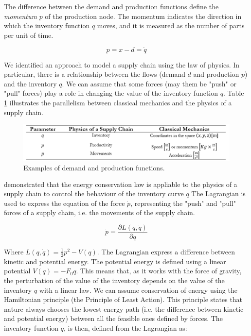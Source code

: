 The difference between the demand and production functions define the \textit{momentum} $p$ of the production node. The momentum indicates the direction in which the inventory function $q$ moves, and it is measured as the number of parts per unit of time.

\begin{equation}
p=x-d=\dot{q}
\label{eq_physics2}
\end{equation}

We identified an approach to model a supply chain using the law of physics. In particular, there is a relationship between the flows (demand $d$ and production $p$) and the inventory $q$. We can assume that some forces (may them be "push" or "pull" forces) play a role in changing the value of the inventory function $q$. Table \ref{tab_classicalMechanics} illustrates the parallelism between classical mechanics and the physics of a supply chain.

\begin{figure}[hbt!]
\centering
\includegraphics[width=1\textwidth]{SectionIntroduction/informationFramework_figures/tab_classicalMechanics.png}
\captionsetup{type=figure}
\caption{Examples of demand and production functions.}
\label{tab_classicalMechanics}
\end{figure}

\cite{Spearman2014} demonstrated that the energy conservation law is appliable to the physics of a supply chain to control the behaviour of the inventory curve $q$ The Lagrangian is used to express the equation of the force $\dot{p}$, representing the "push" and "pull" forces of a supply chain, i.e. the movements of the supply chain.

\begin{equation}
\dot{p}=\frac{\partial L(q,\dot{q})}{\partial q}
\label{eq_physics3}
\end{equation}

Where $L\left(q,\dot{q}\right)=\frac{1}{2}p^2-V(q)$. The Lagrangian express a difference between kinetic and potential energy. The potential energy is defined using a linear potential $V\left(q\right)=-F_0q$. This means that, as it works with the force of gravity, the perturbation of the value of the inventory depends on the value of the inventory $q$ with a linear law. We can assume conservation of energy using the Hamiltonian principle (the Principle of Least Action). This principle states that nature always chooses the lowest energy path (i.e. the difference between kinetic and potential energy) between all the feasible ones defined by forces. The inventory function $q$, is then, defined from the Lagrangian as:

